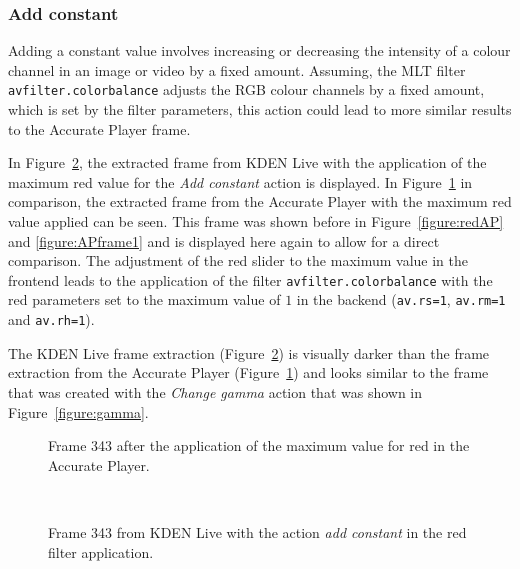 \documentclass[../MasterThesis.tex]{subfiles}
\begin{document}
\subsubsection*{Add constant}

Adding a constant value involves increasing or decreasing the intensity of a colour channel in an image or video by a fixed amount. Assuming, the MLT filter \texttt{avfilter.colorbalance} adjusts the RGB colour channels by a fixed amount, which is set by the filter parameters, this action could lead to more similar results to the Accurate Player frame.

In Figure~\ref{figure:addconstant}, the extracted frame from KDEN Live with the application of the maximum red value for the \textit{Add constant} action is displayed. 
In Figure~\ref{figure:APframe2} in comparison, the extracted frame from the Accurate Player with the maximum red value applied can be seen. This frame was shown before in Figure~\ref{figure:redAP} and \ref{figure:APframe1} and is displayed here again to allow for a direct comparison. The adjustment of the red slider to the maximum value in the frontend leads to the application of the filter \texttt{avfilter.colorbalance} with the red parameters set to the maximum value of $1$ in the backend (\texttt{av.rs=1}, \texttt{av.rm=1} and \texttt{av.rh=1}).

The KDEN Live frame extraction (Figure~\ref{figure:addconstant}) is visually darker than the frame extraction from the Accurate Player (Figure~\ref{figure:APframe2}) and looks similar to the frame that was created with the \textit{Change gamma} action that was shown in Figure~\ref{figure:gamma}.

\begin{minipage}{0.48\textwidth}
	\begin{figure}[H]
		\begin{center}
			\caption[Frame 343 after the application of the red filter in the Accurate Player.]{Frame 343 after the application of the maximum value for red in the Accurate Player.}
			\label{figure:APframe2}
		\end{center}
	\end{figure}
\end{minipage}\begin{minipage}{0.04\textwidth}
	\ 
\end{minipage}\begin{minipage}{0.48\textwidth}
	\begin{figure}[H]
		\begin{center}
			\caption[Frame 343 from KDEN Live with the action \textit{add constant}.]{Frame 343 from KDEN Live with the action \textit{add constant} in the red filter application.}
			\label{figure:addconstant}
		\end{center}
	\end{figure}
\end{minipage}
\vspace*{1em}
\end{document}
